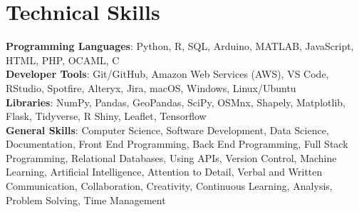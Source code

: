\documentclass[letterpaper,10pt]{article}
\begin{document}
\section{Technical Skills}
 \begin{itemize}[leftmargin=0.15in, label={}]
    \small{\item{
     \textbf{Programming Languages}{: Python, R, SQL, Arduino, MATLAB, JavaScript, HTML, PHP, OCAML, C} \\
     \textbf{Developer Tools}{: Git/GitHub, Amazon Web Services (AWS), VS Code, RStudio, Spotfire, Alteryx, Jira, macOS, Windows, Linux/Ubuntu} \\
     \textbf{Libraries}{: NumPy, Pandas, GeoPandas, SciPy, OSMnx, Shapely, Matplotlib, Flask, Tidyverse, R Shiny, Leaflet, Tensorflow} \\
     \textbf{General Skills}{: Computer Science, Software Development, Data Science, Documentation, Front End Programming, Back End Programming, Full Stack Programming, Relational Databases, Using APIs, Version Control, Machine Learning, Artificial Intelligence, Attention to Detail, Verbal and Written Communication, Collaboration, Creativity, Continuous Learning, Analysis, Problem Solving, Time Management
    }}}
 \end{itemize}


\end{document}
